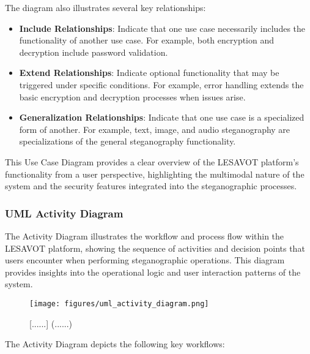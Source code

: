 \documentclass[12pt, a4paper, oneside]{book}
\begin{document}
The diagram also illustrates several key relationships:

\begin{itemize}[leftmargin=*]
    \item \textbf{Include Relationships}: Indicate that one use case necessarily includes the functionality of another use case. For example, both encryption and decryption include password validation.

    \item \textbf{Extend Relationships}: Indicate optional functionality that may be triggered under specific conditions. For example, error handling extends the basic encryption and decryption processes when issues arise.

    \item \textbf{Generalization Relationships}: Indicate that one use case is a specialized form of another. For example, text, image, and audio steganography are specializations of the general steganography functionality.
\end{itemize}

This Use Case Diagram provides a clear overview of the LESAVOT platform's functionality from a user perspective, highlighting the multimodal nature of the system and the security features integrated into the steganographic processes.

\subsubsection{UML Activity Diagram}

The Activity Diagram illustrates the workflow and process flow within the LESAVOT platform, showing the sequence of activities and decision points that users encounter when performing steganographic operations. This diagram provides insights into the operational logic and user interaction patterns of the system.

\begin{figure}[htbp]
    \centering
    \texttt{[image: figures/uml\_activity\_diagram.png]}
    \caption{[......] (......)}
    \label{fig:activity_diagram}
\end{figure}

The Activity Diagram depicts the following key workflows:
\end{document}
